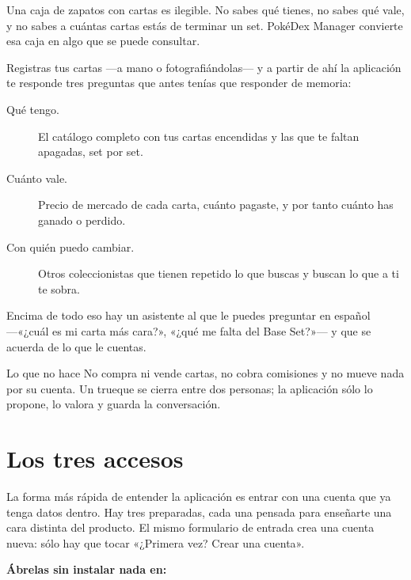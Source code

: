\documentclass[11pt,a4paper]{article}
\begin{document}
Una caja de zapatos con cartas es ilegible. No sabes qué tienes, no sabes qué
vale, y no sabes a cuántas cartas estás de terminar un set. PokéDex Manager
convierte esa caja en algo que se puede consultar.

Registras tus cartas ---a mano o fotografiándolas--- y a partir de ahí la
aplicación te responde tres preguntas que antes tenías que responder de memoria:

\begin{description}
  \item[Qué tengo.] El catálogo completo con tus cartas encendidas y las que te
  faltan apagadas, set por set.
  \item[Cuánto vale.] Precio de mercado de cada carta, cuánto pagaste, y por
  tanto cuánto has ganado o perdido.
  \item[Con quién puedo cambiar.] Otros coleccionistas que tienen repetido lo
  que buscas y buscan lo que a ti te sobra.
\end{description}

Encima de todo eso hay un asistente al que le puedes preguntar en español
---«¿cuál es mi carta más cara?», «¿qué me falta del Base Set?»--- y que se
acuerda de lo que le cuentas.

\begin{pokedexbox}{Lo que no hace}
No compra ni vende cartas, no cobra comisiones y no mueve nada por su cuenta.
Un trueque se cierra entre dos personas; la aplicación sólo lo propone, lo
valora y guarda la conversación.
\end{pokedexbox}

\clearpage
\section{Los tres accesos}

La forma más rápida de entender la aplicación es entrar con una cuenta que ya
tenga datos dentro. Hay tres preparadas, cada una pensada para enseñarte una
cara distinta del producto. El mismo formulario de entrada crea una cuenta
nueva: sólo hay que tocar «¿Primera vez? Crear una cuenta».

\medskip
\noindent
{\sffamily\bfseries\small\color{graphite}Ábrelas sin instalar nada en:}\\[2pt]
\end{document}
